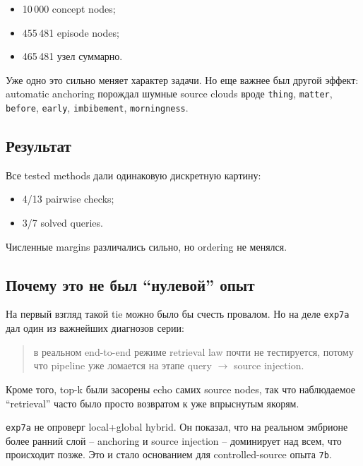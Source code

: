 \begin{itemize}[leftmargin=2em]
\item 10\,000 concept nodes;
\item 455\,481 episode nodes;
\item 465\,481 узел суммарно.
\end{itemize}

Уже одно это сильно меняет характер задачи. Но еще важнее был другой эффект:
automatic anchoring порождал шумные source clouds вроде \texttt{thing},
\texttt{matter}, \texttt{before}, \texttt{early}, \texttt{imbibement},
\texttt{morningness}.

\subsection{Результат}

Все tested methods дали одинаковую дискретную картину:

\begin{itemize}[leftmargin=2em]
\item 4/13 pairwise checks;
\item 3/7 solved queries.
\end{itemize}

Численные margins различались сильно, но ordering не менялся.

\subsection{Почему это не был ``нулевой'' опыт}

На первый взгляд такой tie можно было бы счесть провалом. Но на деле
\texttt{exp7a} дал один из важнейших диагнозов серии:

\begin{quote}
в реальном end-to-end режиме retrieval law почти не тестируется, потому что
pipeline уже ломается на этапе query $\to$ source injection.
\end{quote}

Кроме того, top-k были засорены echo самих source nodes, так что наблюдаемое
``retrieval'' часто было просто возвратом к уже впрыснутым якорям.

\begin{takeaway}
\texttt{exp7a} не опроверг local+global hybrid. Он показал, что на реальном
эмбрионе более ранний слой -- anchoring и source injection -- доминирует над
всем, что происходит позже. Это и стало основанием для controlled-source опыта
\texttt{7b}.
\end{takeaway}

